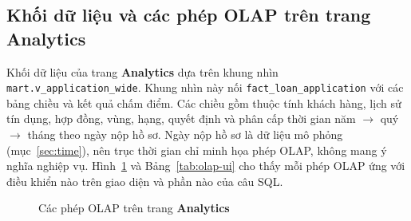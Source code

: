 \subsection{Khối dữ liệu và các phép OLAP trên trang Analytics}
Khối dữ liệu của trang \textbf{Analytics} dựa trên khung nhìn \texttt{mart.v\_application\_wide}. Khung nhìn này nối \texttt{fact\_loan\_application} với các bảng chiều và kết quả chấm điểm. Các chiều gồm thuộc tính khách hàng, lịch sử tín dụng, hợp đồng, vùng, hạng, quyết định và phân cấp thời gian năm $\rightarrow$ quý $\rightarrow$ tháng theo ngày nộp hồ sơ. Ngày nộp hồ sơ là dữ liệu mô phỏng (mục~\ref{sec:time}), nên trục thời gian chỉ minh họa phép OLAP, không mang ý nghĩa nghiệp vụ. Hình~\ref{fig:olap_operations} và Bảng~\ref{tab:olap-ui} cho thấy mỗi phép OLAP ứng với điều khiển nào trên giao diện và phần nào của câu SQL.

\begin{figure}[H]
	\centering
	\caption{Các phép OLAP trên trang \textbf{Analytics}}
	\label{fig:olap_operations}
\end{figure}

